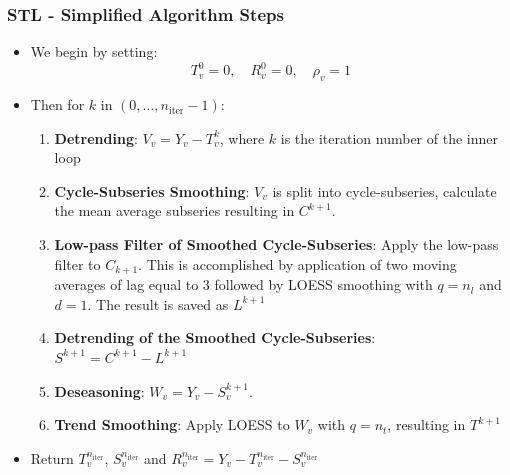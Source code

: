 \documentclass[presentation.tex]{subfiles}
\begin{document}
\begin{frame}
  \frametitle{STL - Simplified Algorithm Steps}
  \begin{itemize}
  \item We begin by setting:
    \[ T_v^{0} = 0, \quad R_v^{0} = 0,  \quad \rho_v = 1 \]
  \item Then for $k$ in $(0, \hdots, n_{\text{iter}}-1)$:
\begin{enumerate}
\item \textbf{Detrending}:
  $V_v = Y_v - T_v^k$, where $k$ is the iteration number of the inner loop
\item \textbf{Cycle-Subseries Smoothing}:
  $V_v$ is split into cycle-subseries, calculate the mean average subseries
  resulting in $C^{k+1}$.
\item \textbf{Low-pass Filter of Smoothed Cycle-Subseries}:
  Apply the low-pass filter to $C_{k+1}$. This is accomplished by application of two
  moving averages of lag equal to 3 followed by LOESS smoothing with $q=n_l$
  and $d=1$. The result is saved as $L^{k+1}$
\item \textbf{Detrending of the Smoothed Cycle-Subseries}:
  $S^{k+1} = C^{k+1} - L^{k+1}$
\item \textbf{Deseasoning}:
  $W_v = Y_v - S_v^{k+1}$. 
\item \textbf{Trend Smoothing}:
  Apply LOESS to $W_v$ with $q = n_t$, resulting in $T^{k+1}$
\end{enumerate}
\item  Return $T^{n_{\text{iter}}}_v$, $S^{n_{\text{iter}}}_v$ and $R^{n_{\text{iter}}}_v = Y_v - T^{n_{\text{iter}}}_v - S^{n_{\text{iter}}}_v$
  \end{itemize}
\end{frame}
\end{document}

